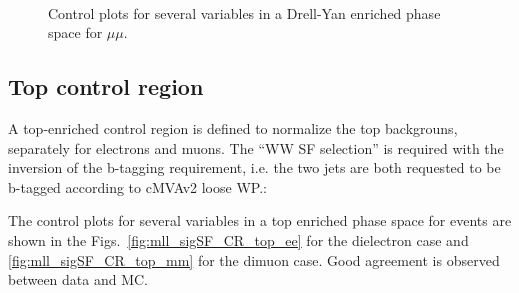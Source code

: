 \begin{figure}[h]
\\

\caption{Control plots for several variables in a Drell-Yan enriched phase space for $\mu \mu$.}
    \label{fig:mll_sigSF_CR_DY_mm}
\end{figure}

\newpage
\clearpage
\subsection{Top control region}
A top-enriched control region is defined to normalize the top backgrouns,
separately for electrons and muons.
The ``WW SF selection'' is required with the inversion of the b-tagging
requirement, i.e. the two jets are both requested to be b-tagged according to
cMVAv2 loose WP.:

The control plots for several variables in a top enriched phase space for events are shown in
the Figs.~\ref{fig:mll_sigSF_CR_top_ee} for the dielectron case and
\ref{fig:mll_sigSF_CR_top_mm} for the dimuon case. Good agreement is observed
between data and MC.


